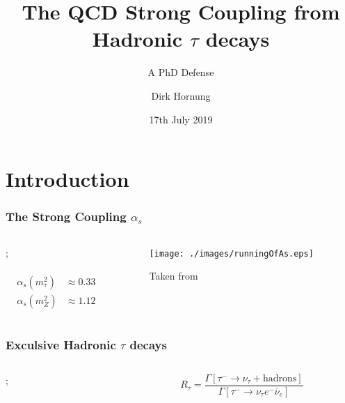 \documentclass{beamer}
\title[\(The Strong Coupling\)]{The QCD Strong Coupling from Hadronic \(\tau\) decays}
\subtitle{A PhD Defense}
\author{Dirk Hornung}
\institute[UAB]{
  Universitat Autònoma de Barcelona \\
  \tiny
  Departamiento de Física
}
\date{17th July 2019}
\begin{document}
\frame{\titlepage}

\section{Introduction}
\begin{frame}
  \frametitle{The Strong Coupling \(\alpha_s\)}
  \begin{columns}
    \begin{column}{0.5\textwidth}
      \centering
      ;
      \\
      \\
      \makebox[\linewidth]{\rule{\textwidth}{0.4pt}}
      \small
      \begin{equation}
        \begin{split}
          \alpha_s(m_\tau^2) &\approx 0.33 \\
          \alpha_s(m_Z^2) &\approx  1.12
      \end{split}
    \end{equation}
    \end{column}
    \begin{column}{0.5\textwidth}
      \begin{figure}
        \texttt{[image: ./images/runningOfAs.eps]}\\[-1ex]
        \caption{\tiny Taken from \cite{Deur2016}}
      \end{figure}
    \end{column}
  \end{columns}
\end{frame}
\begin{frame}
  \frametitle{Exculsive Hadronic \(\tau\) decays}
  \begin{columns}
    \begin{column}{0.5\textwidth}
      ;
    \end{column}
    \begin{column}{0.5\textwidth}
      \begin{equation}
        R_\tau = \frac{\Gamma[\tau^- \to \nu_\tau + \text{hadrons}]}{\Gamma[\tau^- \to \nu_\tau e^- \overline{\nu}_{e}]}
      \end{equation}
    \end{column}
  \end{columns}
\end{frame}
\end{document}
